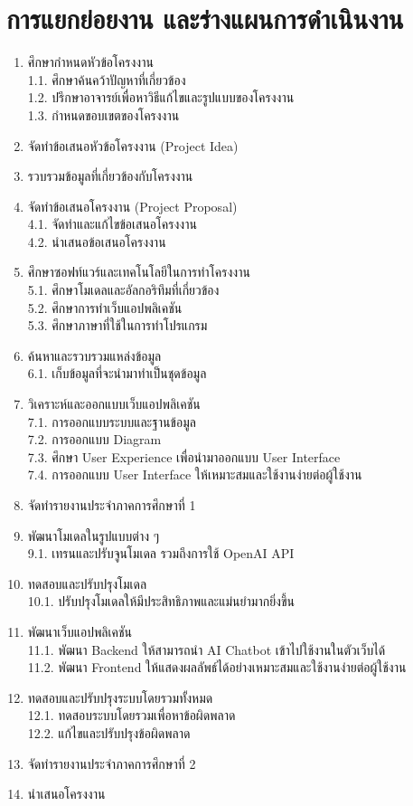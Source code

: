 \documentclass[12pt,oneside,openright,a4paper]{cpe-thai-project}
\begin{document}
\section{การแยกย่อยงาน และร่างแผนการดำเนินงาน}
\begin{enumerate}
\item ศึกษากำหนดหัวข้อโครงงาน \\
1.1.	ศึกษาค้นคว้าปัญหาที่เกี่ยวข้อง \\
1.2.	ปรึกษาอาจารย์เพื่อหาวิธีแก้ไขและรูปแบบของโครงงาน \\
1.3.	กำหนดขอบเขตของโครงงาน
\item จัดทำข้อเสนอหัวข้อโครงงาน (Project Idea)
\item รวบรวมข้อมูลที่เกี่ยวข้องกับโครงงาน
\item จัดทำข้อเสนอโครงงาน (Project Proposal) \\
4.1.	จัดทำและแก้ไขข้อเสนอโครงงาน \\
4.2.	นำเสนอข้อเสนอโครงงาน
\item ศึกษาซอฟท์แวร์และเทคโนโลยีในการทำโครงงาน \\
5.1.	ศึกษาโมเดลและอัลกอริทึมที่เกี่ยวข้อง \\
5.2.	ศึกษาการทำเว็บแอปพลิเคชัน \\
5.3.	ศึกษาภาษาที่ใช้ในการทำโปรแกรม
\item ค้นหาและรวบรวมแหล่งข้อมูล \\
6.1.	เก็บข้อมูลที่จะนำมาทำเป็นชุดข้อมูล
\item วิเคราะห์และออกแบบเว็บแอปพลิเคชัน \\
7.1.	การออกแบบระบบและฐานข้อมูล \\
7.2.	การออกแบบ Diagram \\
7.3.	ศึกษา User Experience เพื่อนำมาออกแบบ User Interface \\
7.4.	การออกแบบ User Interface ให้เหมาะสมและใช้งานง่ายต่อผู้ใช้งาน
\item จัดทำรายงานประจำภาคการศึกษาที่ 1
\item พัฒนาโมเดลในรูปแบบต่าง ๆ \\
9.1.	เทรนและปรับจูนโมเดล รวมถึงการใช้ OpenAI API
\item ทดสอบและปรับปรุงโมเดล \\
10.1.	ปรับปรุงโมเดลให้มีประสิทธิภาพและแม่นยำมากยิ่งขึ้น
\item พัฒนาเว็บแอปพลิเคชัน \\
11.1.	พัฒนา Backend ให้สามารถนำ AI Chatbot เข้าไปใช้งานในตัวเว็บได้ \\
11.2.	พัฒนา Frontend ให้แสดงผลลัพธ์ได้อย่างเหมาะสมและใช้งานง่ายต่อผู้ใช้งาน
\item ทดสอบและปรับปรุงระบบโดยรวมทั้งหมด \\
12.1.	ทดสอบระบบโดยรวมเพื่อหาข้อผิดพลาด \\
12.2.	แก้ไขและปรับปรุงข้อผิดพลาด
\item จัดทำรายงานประจำภาคการศึกษาที่ 2
\item นำเสนอโครงงาน
\end{enumerate} \newpage
\end{document}
